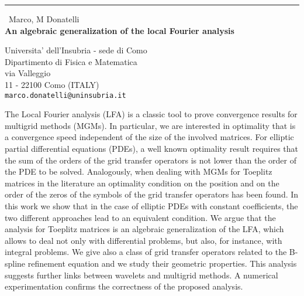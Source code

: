 \documentclass{report}
\begin{document}
\begin{center}
\rule{6in}{1pt} \
{\large Marco, M Donatelli \\
{\bf An algebraic generalization of the local Fourier analysis}}

Universita' dell'Insubria - sede di Como \\ Dipartimento di Fisica e Matematica \\ via Valleggio \\ 11 - 22100 Como (ITALY)
\\
{\tt marco.donatelli@uninsubria.it}\end{center}

The Local Fourier analysis (LFA) is a classic tool to prove convergence
results for multigrid methods (MGMs). In particular, we
are interested in optimality that is a convergence speed independent of
the size of the involved matrices. For elliptic partial differential
equations (PDEs), a well known optimality result requires that the sum of
the orders of the grid transfer operators is not lower than the order of
the PDE to be solved. Analogously, when dealing with MGMs for Toeplitz
matrices in the literature an optimality condition on the position and on
the order of the zeros of the symbols of the grid transfer operators has
been found. In this work we show that in the case of elliptic PDEs with
constant coefficients, the two different approaches lead to an equivalent
condition. We argue that the analysis for Toeplitz matrices is an
algebraic generalization of the LFA, which allows to deal not only with
differential problems, but also, for instance, with integral problems. We
give also a class of grid
transfer operators related to the B-spline refinement equation and
we study their geometric properties. This analysis suggests further
links between wavelets and multigrid methods. A numerical experimentation
confirms the correctness of the proposed analysis.
\end{document}

